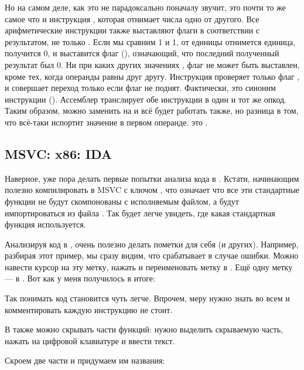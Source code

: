 \label{CMPandSUB}
Но на самом деле, как это не парадоксально поначалу звучит, \CMP это почти то же самое что и инструкция \SUB, которая отнимает числа одно от другого.
Все арифметические инструкции также выставляют флаги в соответствии с результатом, не только \CMP.
Если мы сравним 1 и 1, от единицы отнимется единица, получится 0, и выставится флаг \ZF (), означающий, что последний полученный результат был 0.
Ни при каких других значениях \EAX, флаг \ZF не может быть выставлен, кроме тех, когда операнды равны друг другу.
Инструкция \JNE проверяет только флаг \ZF, и совершает переход только если флаг не поднят. Фактически, \JNE это синоним инструкции \JNZ ().
Ассемблер транслирует обе инструкции в один и тот же опкод.
Таким образом, можно \CMP заменить на \SUB и всё будет работать также, но разница в том, что \SUB всё-таки испортит значение в первом операнде.
\CMP это .

\subsection{MSVC: x86: IDA}

Наверное, уже пора делать первые попытки анализа кода в \IDA.
Кстати, начинающим полезно компилировать в MSVC с ключом , что означает что все эти стандартные
функции не будут скомпонованы с исполняемым файлом, а будут импортироваться из файла .
Так будет легче увидеть, где какая стандартная функция используется.

Анализируя код в \IDA, очень полезно делать пометки для себя (и других).
Например, разбирая этот пример, мы сразу видим, что  срабатывает в случае ошибки.
Можно навести курсор на эту метку, нажать  и переименовать метку в .
Ещё одну метку --- в .
Вот как у меня получилось в итоге:



Так понимать код становится чуть легче.
Впрочем, меру нужно знать во всем и комментировать каждую инструкцию не стоит.

В \IDA также можно скрывать части функций: нужно выделить скрываемую часть, нажать \q{--} на цифровой клавиатуре и ввести текст.

Скроем две части и придумаем им названия:

